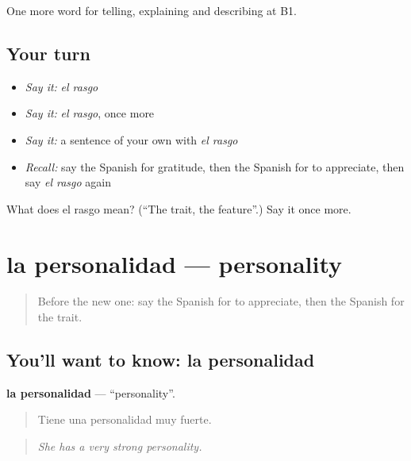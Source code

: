 \begin{grammarlens}[title={What you've built}]
One more word for telling, explaining and describing at B1.
\end{grammarlens}

\subsection*{Your turn}
\begin{itemize}
\raggedright
  \item \emph{Say it:} \emph{el rasgo}
  \item \emph{Say it:} \emph{el rasgo}, once more
  \item \emph{Say it:} a sentence of your own with \emph{el rasgo}
  \item \emph{Recall:} say the Spanish for gratitude, then the Spanish for to appreciate, then say \emph{el rasgo} again
\end{itemize}

\begin{tcolorbox}[breakable,colback=teal!4,colframe=teal!35!black,title={Before you move on}]
What does el rasgo mean? (\textquotedblleft{}The trait, the feature\textquotedblright{}.) Say it once more.
\end{tcolorbox}
\section[la personalidad]{la personalidad — personality}

\label{lesson:ES-C721-personalidad}



\begin{quote}
Before the new one: say the Spanish for to appreciate, then the Spanish for the trait.
\end{quote}

\subsection*{You'll want to know: la personalidad}
\textbf{la personalidad} — \textquotedblleft{}personality\textquotedblright{}.

\begin{quote}
Tiene una personalidad muy fuerte.
\end{quote}

\begin{quote}
\emph{She has a very strong personality.}
\end{quote}

